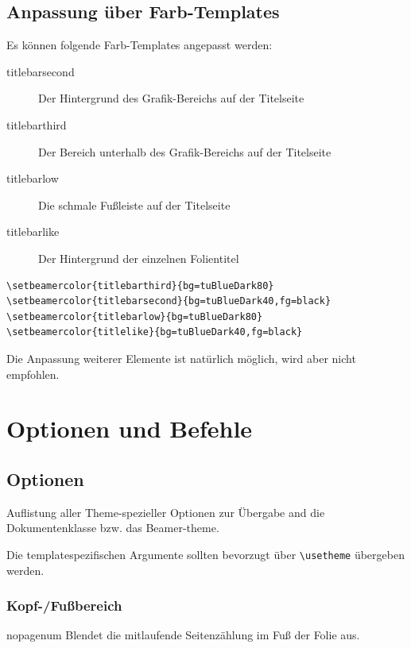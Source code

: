 \documentclass[cmyk,a4paper,colorscheme=green,TUBStitlepage=picture]{tubsreprt}
\begin{document}
\section{Anpassung über Farb-Templates}

Es können folgende Farb-Templates angepasst werden:
\begin{description}
  \item[\color{tuRed100}\ttfamily titlebarsecond]
    Der Hintergrund des Grafik-Bereichs auf der Titelseite
  \item[\color{tuRed100}\ttfamily titlebarthird]
    Der Bereich unterhalb des Grafik-Bereichs auf der Titelseite
  \item[\color{tuRed100}\ttfamily titlebarlow]
    Die schmale Fußleiste auf der Titelseite
  \item[\color{tuRed100}\ttfamily titlebarlike]
    Der Hintergrund der einzelnen Folientitel
\end{description}

\example

\begin{lstlisting}
\setbeamercolor{titlebarthird}{bg=tuBlueDark80}
\setbeamercolor{titlebarsecond}{bg=tuBlueDark40,fg=black}
\setbeamercolor{titlebarlow}{bg=tuBlueDark80}
\setbeamercolor{titlelike}{bg=tuBlueDark40,fg=black}
\end{lstlisting}

Die Anpassung weiterer Elemente ist natürlich möglich,
wird aber nicht empfohlen.

\chapter{Optionen und Befehle}

\section{Optionen}\label{optionen}

Auflistung aller Theme-spezieller Optionen zur Übergabe and die
Dokumentenklasse bzw. das Beamer-theme.

Die templatespezifischen Argumente sollten bevorzugt
über \lstinline!\usetheme! übergeben werden.

\subsection{Kopf-/Fußbereich}

\begin{classoption}{nopagenum}
  Blendet die mitlaufende Seitenzählung im Fuß der Folie aus.
\end{classoption}
\end{document}
